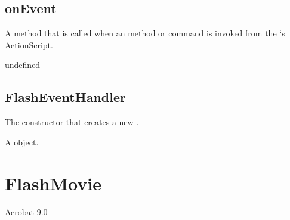 \documentclass[letterpaper,12pt,english,openany,oneside]{sphinxmanual}
\begin{document}
\label{\detokenize{JS_3D_API:properties-8}}


\subsection{onEvent}
\label{\detokenize{JS_3D_API:onevent-1}}\label{\detokenize{JS_3D_API:id5}}
A method that is called when an  method or  command is invoked from the  ‘s ActionScript.

\label{\detokenize{JS_3D_API:syntax-18}}

\begin{sphinxVerbatim}[commandchars=\\\{\}]
\end{sphinxVerbatim}
\label{\detokenize{JS_3D_API:parameters-12}}

\label{\detokenize{JS_3D_API:section-22}}\label{\detokenize{JS_3D_API:returns-18}}

undefined


\subsection{FlashEventHandler}
\label{\detokenize{JS_3D_API:flasheventhandler-1}}\label{\detokenize{JS_3D_API:id6}}
The constructor that creates a new .

\label{\detokenize{JS_3D_API:syntax-19}}

\begin{sphinxVerbatim}[commandchars=\\\{\}]
 
\end{sphinxVerbatim}
\label{\detokenize{JS_3D_API:returns-19}}

A  object.


\section{FlashMovie}
\label{\detokenize{JS_3D_API:flashmovie}}
Acrobat 9.0
\end{document}
